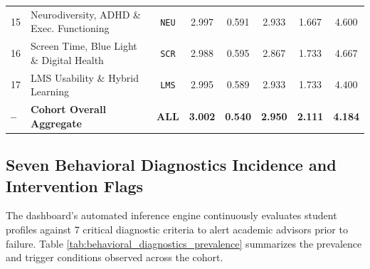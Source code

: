 \begin{table}[htbp]
\begin{tabular}{llcccccc}
15 & Neurodiversity, ADHD \& Exec. Functioning & \texttt{NEU} & 2.997 & 0.591 & 2.933 & 1.667 & 4.600 \\
16 & Screen Time, Blue Light \& Digital Health & \texttt{SCR} & 2.988 & 0.595 & 2.867 & 1.733 & 4.667 \\
17 & LMS Usability \& Hybrid Learning       & \texttt{LMS}  & 2.995 & 0.589 & 2.933 & 1.733 & 4.400 \\
\midrule
\textbf{--} & \textbf{Cohort Overall Aggregate} & \textbf{ALL} & \textbf{3.002} & \textbf{0.540} & \textbf{2.950} & \textbf{2.111} & \textbf{4.184} \\
\bottomrule
\end{tabular}
\end{table}

\subsection{Seven Behavioral Diagnostics Incidence and Intervention Flags}
The dashboard's automated inference engine continuously evaluates student profiles against 7 critical diagnostic criteria to alert academic advisors prior to failure. Table \ref{tab:behavioral_diagnostics_prevalence} summarizes the prevalence and trigger conditions observed across the cohort.

